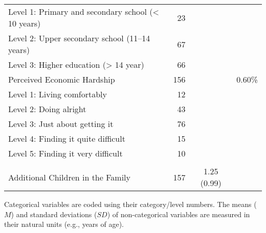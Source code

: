 {\begin{tabular}{lrcc}
        \hspace{0.75cm} Level 1: Primary and secondary school (< 10 years) & 23    &       &  \\
        \hspace{0.75cm} Level 2: Upper secondary school (11--14 years) & 67    &       &  \\
        \hspace{0.75cm} Level 3: Higher education (> 14  year) & 66    &       &  \\
        \rowcolor[rgb]{ .949,  .949,  .949} Perceived Economic Hardship & 156   &       & 0.60\% \\
        \hspace{0.75cm} Level 1: Living comfortably & 12    &       &  \\
        \hspace{0.75cm} Level 2: Doing alright & 43    &       &  \\
        \hspace{0.75cm} Level 3: Just about getting it & 76    &       &  \\
        \hspace{0.75cm} Level 4: Finding it quite difficult & 15    &       &  \\
        \hspace{0.75cm} Level 5: Finding it very difficult & 10    &       &  \\
        &&&\\
        \rowcolor[rgb]{ .949,  .949,  .949} Additional Children in the Family & 157   & 1.25 (0.99) &  \\
        \bottomrule
    \end{tabular}%
}{Categorical variables are coded using their category/level numbers. The means ($M$) and standard deviations ($SD$) of non-categorical variables are measured in their natural units (e.g., years of age).}

